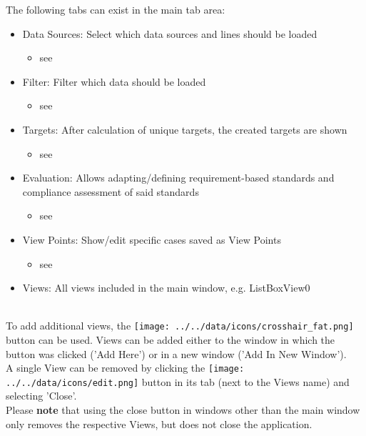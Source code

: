 The following tabs can exist in the main tab area:
\begin{itemize}
 \item Data Sources: Select which data sources and lines should be loaded
  \begin{itemize}
 \item see 
 \end{itemize}
 \item Filter: Filter which data should be loaded
   \begin{itemize}
 \item see 
 \end{itemize}
  \item Targets: After calculation of unique targets, the created targets are shown
 \begin{itemize}
 \item see 
 \end{itemize}
 \item Evaluation: Allows adapting/defining requirement-based standards and compliance assessment of said standards
 \begin{itemize}
 \item see 
 \end{itemize}
 \item View Points: Show/edit specific cases saved as View Points
  \begin{itemize}
 \item see 
 \end{itemize}
 \item Views: All views included in the main window, e.g. ListBoxView0
\end{itemize}
\  \\

To add additional views, the \texttt{[image: ../../data/icons/crosshair\_fat.png]} button can be used. 
Views can be added either to the window in which the button was clicked ('Add Here') or in a new window ('Add In New Window'). \\

A single View can be removed by clicking the \texttt{[image: ../../data/icons/edit.png]} button in its tab (next to the Views name) and selecting 'Close'. \\

Please \textbf{note} that using the close button in windows other than the main window only removes the respective Views, but does not close the application.


